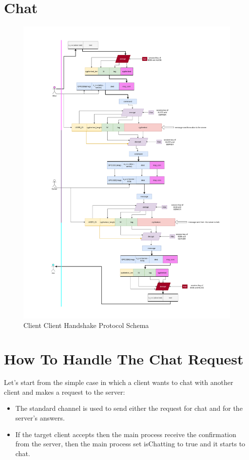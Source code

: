 \documentclass[11pt]{report}
\begin{document}
\section{Chat}
\begin{figure}[H]
	\centering
	\includegraphics[scale=0.09]{img/message_relay.png}
	\caption{Client Client Handshake Protocol Schema}
	\label {img: MessageRelay}
\end{figure}

\section{How To Handle The Chat Request}
\noindent Let's start from the simple case in which a client wants to chat with another client and makes a request to the server: 
\begin{itemize}
	\item The standard channel is used to send either the request for chat and for the server's answers.
	\item If the target client accepts then the main process receive the confirmation from the server, then the main process set isChatting to true and it starts to chat.
\end{itemize}
\end{document}
